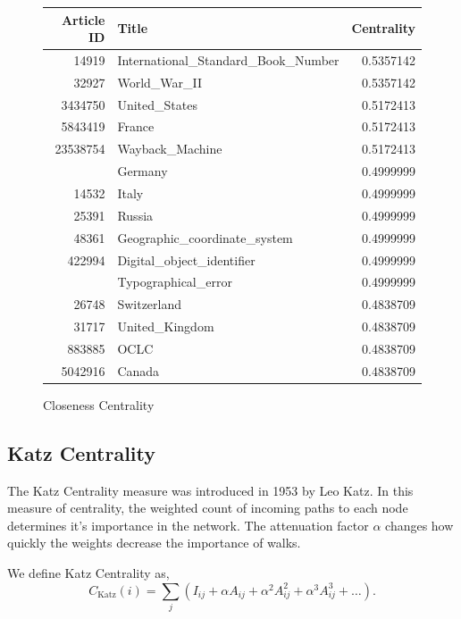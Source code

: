 \documentclass{article}
\begin{document}
\begin{figure}[H]
    \caption[fig]{Closeness Centrality}
    \centering
    \begin{tabular}{rlr}
        \toprule
        Article ID & Title & Centrality \\
        \midrule
        14919 & International\_Standard\_Book\_Number & 0.5357142\\
        32927 & World\_War\_II & 0.5357142\\
        3434750 & United\_States & 0.5172413\\
        5843419 & France & 0.5172413\\
        23538754 & Wayback\_Machine & 0.5172413\\
        \addlinespace
        11867 & Germany & 0.4999999\\
        14532 & Italy & 0.4999999\\
        25391 & Russia & 0.4999999\\
        48361 & Geographic\_coordinate\_system & 0.4999999\\
        422994 & Digital\_object\_identifier & 0.4999999\\
        \addlinespace
        1057428 & Typographical\_error & 0.4999999\\
        26748 & Switzerland & 0.4838709\\
        31717 & United\_Kingdom & 0.4838709\\
        883885 & OCLC & 0.4838709\\
        5042916 & Canada & 0.4838709\\
    \bottomrule
\end{tabular}
\end{figure}




\subsection{Katz Centrality}

The Katz Centrality measure was introduced in 1953 by Leo Katz. 
In this measure of centrality, the weighted count of incoming paths to each node determines it's importance in the network. The attenuation factor $\alpha$ changes how quickly the weights decrease the importance of walks.

We define Katz Centrality as,
\begin{equation*}
    C_{\textrm{Katz}}(i) = \sum_{j} (I_{ij} + \alpha A_{ij} + \alpha^2 A_{ij}^2 + \alpha^3 A_{ij}^3 + \dots).
\end{equation*}
\end{document}
